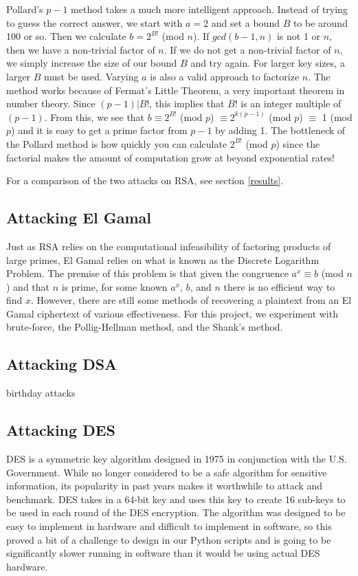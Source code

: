 \documentclass[12pt]{report}
\begin{document}
Pollard's $p-1$ method takes a much more intelligent approach. Instead of trying to guess the correct answer, we start with $a=2$ and set a bound $B$ to be around
100 or so. Then we calculate $b=2^{B!}$ (mod $n$). If $gcd(b-1,n)$ is not 1 or $n$, then we have a non-trivial factor of $n$. If we do not get a non-trivial factor
of $n$, we simply increase the size of our bound $B$ and try again. For larger key sizes, a larger $B$ must be used. Varying $a$ is also a valid approach to
factorize $n$. The method works because of Fermat's Little Theorem, a very important theorem in number theory. Since $(p-1)|B!$, this implies that $B!$ is an
integer multiple of $(p-1)$. From this, we see that $b \equiv 2^{B!}$ (mod $p$) $\equiv 2^{k(p-1)}$ (mod $p$) $\equiv$ 1 (mod $p$) and it is easy to get a prime
factor from $p-1$ by adding 1. The bottleneck of the Pollard method is how quickly you can calculate $2^{B!}$ (mod $p$) since the factorial makes the amount of
computation grow at beyond exponential rates!

For a comparison of the two attacks on RSA, see section \ref{results}.

\subsection{Attacking El Gamal}
Just as RSA relies on the computational infeasibility of factoring products of large primes, El Gamal relies on what is known as the Discrete Logarithm Problem. The
premise of this problem is that given the congruence $a^{x} \equiv b$ (mod $n$) and that $n$ is prime, for some known $a^{x}$, $b$, and $n$ there is no efficient
way to find $x$. However, there are still some methods of recovering a plaintext from an El Gamal ciphertext of various effectiveness. For this project, we
experiment with brute-force, the Pollig-Hellman method, and the Shank's method.


\subsection{Attacking DSA}
birthday attacks

\subsection{Attacking DES}
DES is a symmetric key algorithm designed in 1975 in conjunction with the U.S. Government. While no longer considered to be a safe algorithm for sensitive
information, its popularity in past years makes it worthwhile to attack and benchmark. DES takes in a 64-bit key and uses this key to create 16 sub-keys to be used
in each round of the DES encryption. The algorithm was designed to be easy to implement in hardware and difficult to implement in software, so this proved a bit of
a challenge to design in our Python scripts and is going to be significantly slower running in software than it would be using actual DES hardware.
\end{document}
